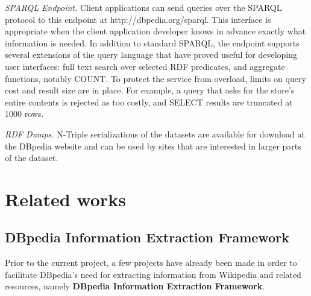 \documentclass[thesis=M,english,hidelinks]{FITthesis}[2019/12/23]
\begin{document}
\textit{SPARQL Endpoint.} Client applications can send queries over the SPARQL protocol to this
endpoint at http://dbpedia.org/sparql. This interface is appropriate when the client application developer knows in advance exactly what information is needed. In addition to standard SPARQL, the endpoint supports several extensions of the query language that have proved useful for developing user interfaces: full text search over selected RDF predicates, and aggregate functions, notably COUNT. To protect the service from overload, limits on query cost and result size are in place. For example, a query that asks for the store’s entire contents is rejected as too costly, and SELECT results are truncated at 1000 rows.

\textit{RDF Dumps.} N-Triple serializations of the datasets are available for download at the DBpedia website and can be used by sites that are interested in larger parts of the dataset.

\section{Related works}

\subsection{DBpedia Information Extraction Framework}\label{dbpedia_in_extraction_framework}
Prior to the current project, a few projects have already been made in order to facilitate DBpedia's need for extracting information from Wikipedia and related resources, namely \textbf{DBpedia Information Extraction Framework}\cite{dbpedia_live_extraction}. 
\end{document}
